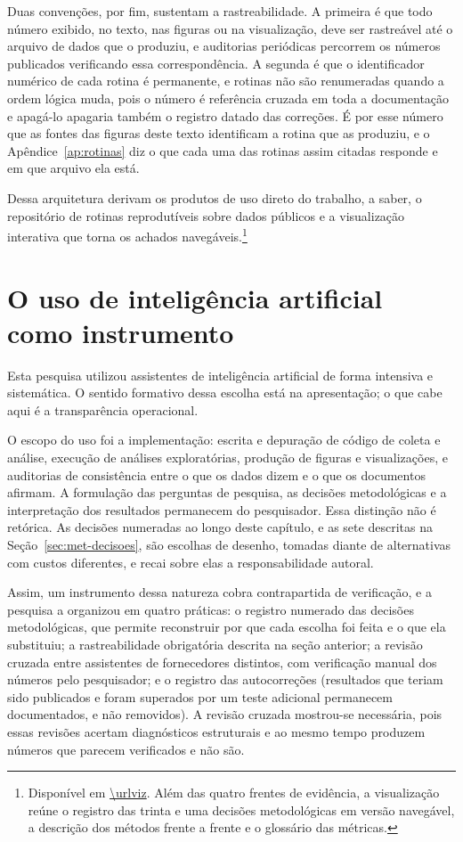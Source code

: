 Duas convenções, por fim, sustentam a rastreabilidade. A primeira é que todo
número exibido, no texto, nas figuras ou na visualização, deve ser rastreável
até o arquivo de dados que o produziu, e auditorias periódicas percorrem os
números publicados verificando essa correspondência. A segunda é que o
identificador numérico de cada rotina é permanente, e rotinas não são
renumeradas quando a ordem lógica muda, pois o número é referência cruzada em
toda a documentação e apagá-lo apagaria também o registro datado das correções.
É por esse número que as fontes das figuras deste texto identificam a rotina
que as produziu, e o Apêndice~\ref{ap:rotinas} diz o que cada uma das rotinas
assim citadas responde e em que arquivo ela está.

Dessa arquitetura derivam os produtos de uso direto do trabalho, a saber, o
repositório de rotinas reprodutíveis sobre dados públicos e a visualização
interativa que torna os achados navegáveis.\footnote{Disponível em
\url{\urlviz}. Além das quatro frentes de evidência, a visualização reúne o
registro das trinta e uma decisões metodológicas em versão navegável, a
descrição dos métodos frente a frente e o glossário das métricas.}

\section{O uso de inteligência artificial como instrumento}
\label{sec:met-ia}

Esta pesquisa utilizou assistentes de inteligência artificial de forma
intensiva e sistemática. O sentido formativo dessa escolha está na
apresentação; o que cabe aqui é a transparência operacional.

O escopo do uso foi a implementação: escrita e depuração de código de coleta e
análise, execução de análises exploratórias, produção de figuras e
visualizações, e auditorias de consistência entre o que os dados dizem e o que
os documentos afirmam. A formulação das perguntas de pesquisa, as decisões
metodológicas e a interpretação dos resultados permanecem do pesquisador. Essa
distinção não é retórica. As decisões numeradas ao longo deste capítulo, e as
sete descritas na Seção~\ref{sec:met-decisoes}, são escolhas de desenho,
tomadas diante de alternativas com custos diferentes, e recai sobre elas
a responsabilidade autoral.

Assim, um instrumento dessa natureza cobra contrapartida de verificação, e a
pesquisa a organizou em quatro práticas: o registro numerado das decisões
metodológicas, que permite reconstruir por que cada escolha foi feita e o que
ela substituiu; a rastreabilidade obrigatória descrita na seção anterior; a
revisão cruzada entre assistentes de fornecedores distintos, com verificação
manual dos números pelo pesquisador; e o registro das autocorreções
(resultados que teriam sido publicados e foram superados por um teste
adicional permanecem documentados, e não removidos). A revisão cruzada
mostrou-se necessária, pois essas revisões acertam diagnósticos estruturais e ao
mesmo tempo produzem números que parecem verificados e não são.

